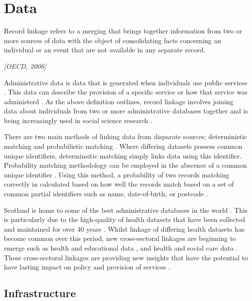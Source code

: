 \documentclass[12pt,]{report}
\begin{document}
\FloatBarrier
\newpage
{}

\chapter{Data}\label{ch:data}

\epigraph{Record linkage refers to a merging that brings together information from two or more sources of data with the object of consolidating facts concerning an individual or an event that are not available in any separate record.}{\textit{[OECD, 2006]}}

Administrative data is data that is generated when individuals use
public services \citep{RN85, RN352}. This data can describe the
provision of a specific service or how that service was administerd
\citep{RN85, RN352}. As the above definition outlines, record linkage
involves joining data about individuals from two or more administrative
databases together \citep{RN279, RN470} and is being increasingly used
in social science research \citep{RN133, RN276}.

There are two main methods of linking data from disparate sources;
deterministic matching and probabilistic matching \citep{RN279, RN470}.
Where differing datasets possess common unique identifiers,
determinsitic matching simply links data using this identifier.
Probability matching methodology can be employed in the abscence of a
common unique identifier \citep{RN279, RN470}. Using this method, a
probability of two records matching correctly in calculated based on how
well the records match based on a set of common partial identifiers such
as name, date-of-birth, or postcode \citep{RN279, RN470}.

Scotland is home to some of the best administrative databases in the
world \citep{RN85}. This is particularly due to the high-quality of
health datasets that have been collected and maintained for over 40
years \citep{RN85, RN470}. Whilst linkage of differing health datasets
has become common over this period, new cross-sectoral linkages are
beginning to emerge such as health and educational data \citep{RN471},
and health and social care data \citep{RN132}. These cross-sectoral
linkages are providing new insights that have the potential to have
lasting impact on policy and provision of services \citep{RN85, RN133}.

\section{Infrastructure}\label{sec:infrastructure}
\end{document}
